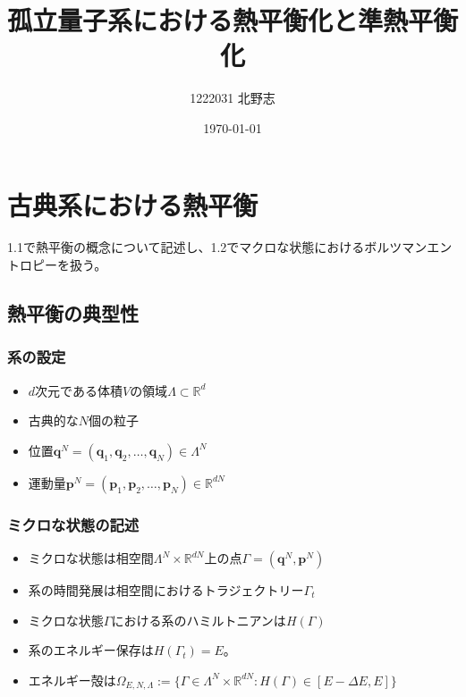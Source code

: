\documentclass{ltjsarticle}
\title{孤立量子系における熱平衡化と準熱平衡化}
\author{1222031 北野志}
\date{\today}
\begin{document}
\maketitle


  \section{古典系における熱平衡}
  1.1で熱平衡の概念について記述し、1.2でマクロな状態におけるボルツマンエントロピーを扱う。
  \subsection{熱平衡の典型性}
  \subsubsection{系の設定}
  \begin{itemize}
    \item $d$次元である体積$V$の領域$\Lambda\subset\mathbb{R}^d$
    \item 古典的な$N$個の粒子
    \item 位置$\bm{q}^N=(\bm{q}_1,\bm{q}_2,\dots,\bm{q}_N)\in\Lambda^N$
    \item 運動量$\bm{p}^N=(\bm{p}_1,\bm{p}_2,\dots,\bm{p}_N)\in\mathbb{R}^{dN}$
  \end{itemize}
  \subsubsection{ミクロな状態の記述}
  \begin{itemize}
  \item ミクロな状態は相空間$\Lambda^N\times\mathbb{R}^{dN}$上の点$\Gamma=(\bm{q}^N,\bm{p}^N)$
  \item 系の時間発展は相空間におけるトラジェクトリー$\Gamma_t$ 
  \item ミクロな状態$\Gamma$における系のハミルトニアンは$H(\Gamma)$
  \item 系のエネルギー保存は$H(\Gamma_t)=E$。
  \item エネルギー殻は$\Omega_{E,N,\Lambda}:=\{\Gamma\in\Lambda^N\times\mathbb{R}^{dN}: H(\Gamma)\in[E-\Delta E,E]\}$
  \end{itemize}
\end{document}
